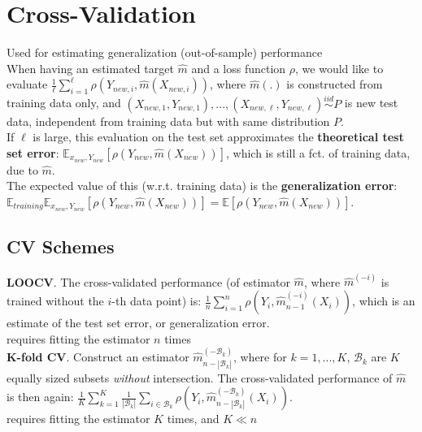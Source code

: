 \section{Cross-Validation}
\textrightarrow Used for estimating generalization (out-of-sample) performance \\
When having an estimated target $\hat{m}$ and a loss function $\rho$, we would like to evaluate $\frac{1}{\ell} \sum_{i=1}^\ell \rho(Y_{new,i}, \hat{m}(X_{new, i}))$, where $\hat{m}(.)$ is constructed from training data only, and $(X_{new,1}, Y_{new, 1}), ..., (X_{new,\ell}, Y_{new, \ell}) \overset{iid}{\sim} P$ is new test data, independent from training data but with same distribution $P$. \\ 
If $\ell$ is large, this evaluation on the test set approximates the \textbf{theoretical test set error}: $\mathbb{E}_{x_{new}, Y_{new}}[\rho \left(Y_{new}, \hat{m}(X_{new}) \right)]$, which is still a fct. of training data, due to $\hat{m}$. \\
The expected value of this (w.r.t. training data) is the \textbf{generalization error}: $\mathbb{E}_{training}\mathbb{E}_{x_{new}, Y_{new}}[\rho \left(Y_{new}, \hat{m}(X_{new}) \right)] = \mathbb{E}[\rho \left(Y_{new}, \hat{m}(X_{new}) \right)]$.\\

\vspace{-0.8\baselineskip}
\subsection*{CV Schemes}

\textbf{LOOCV}. The cross-validated performance (of estimator $\hat{m}$, where $\hat{m}^{(-i)}$ is trained without the $i$-th data point) is: $\frac{1}{n}\sum_{i=1}^n\rho\left(Y_i, \hat{m}_{n-1}^{(-i)}(X_i)\right)$, which is an estimate of the test set error, or generalization error. \\
\textrightarrow requires fitting the estimator $n$ times \\

\vspace{-0.5\baselineskip}
\textbf{K-fold CV}. Construct an estimator $\hat{m}^{(-\mathcal{B}_k)}_{n-|\mathcal{B}_k|}$, where for $k=1,...,K$, $\mathcal{B}_k$ are $K$ equally sized subsets \emph{without} intersection. The cross-validated performance of $\hat{m}$ is then again: $\frac{1}{K}\sum_{k=1}^K\frac{1}{|\mathcal{B}_k|} \sum_{i\in \mathcal{B}_k} \rho \left( Y_i,  \hat{m}^{(-\mathcal{B}_k)}_{n-|\mathcal{B}_k|}(X_i)\right)$. \\
\textrightarrow requires fitting the estimator $K$ times, and $K \ll n$ \\

